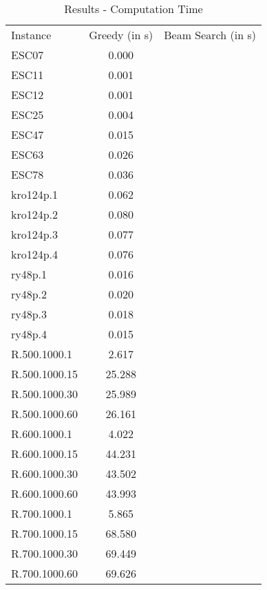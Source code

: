 \documentclass[]{article}
\begin{document}
	\begin{table}[htb]
		\begin{tabular}{lcc}
			Instance & Greedy (in s) & Beam Search (in s) \\
			ESC07 & 0.000 & \\
			ESC11 & 0.001 & \\
			ESC12 & 0.001 & \\
			ESC25 & 0.004 & \\
			ESC47 & 0.015 & \\
			ESC63 & 0.026 & \\
			ESC78 & 0.036 & \\
			kro124p.1 & 0.062 & \\
			kro124p.2 & 0.080 & \\
			kro124p.3 & 0.077 & \\
			kro124p.4 & 0.076 & \\
			ry48p.1   & 0.016 & \\
			ry48p.2   & 0.020 & \\
			ry48p.3   & 0.018 & \\
			ry48p.4   & 0.015 & \\
			R.500.1000.1  & 2.617 & \\
			R.500.1000.15 & 25.288 & \\
			R.500.1000.30 & 25.989 & \\
			R.500.1000.60 & 26.161 & \\
			R.600.1000.1  & 4.022 & \\
			R.600.1000.15 & 44.231 & \\
			R.600.1000.30 & 43.502 & \\
			R.600.1000.60 & 43.993 & \\
			R.700.1000.1  & 5.865 & \\
			R.700.1000.15 & 68.580 & \\
			R.700.1000.30 & 69.449 & \\
			R.700.1000.60 & 69.626 & \\
		\end{tabular}
		\caption{Results - Computation Time}
		\label{table:results_time}
	\end{table}





    \newpage

	 
	
\end{document}

